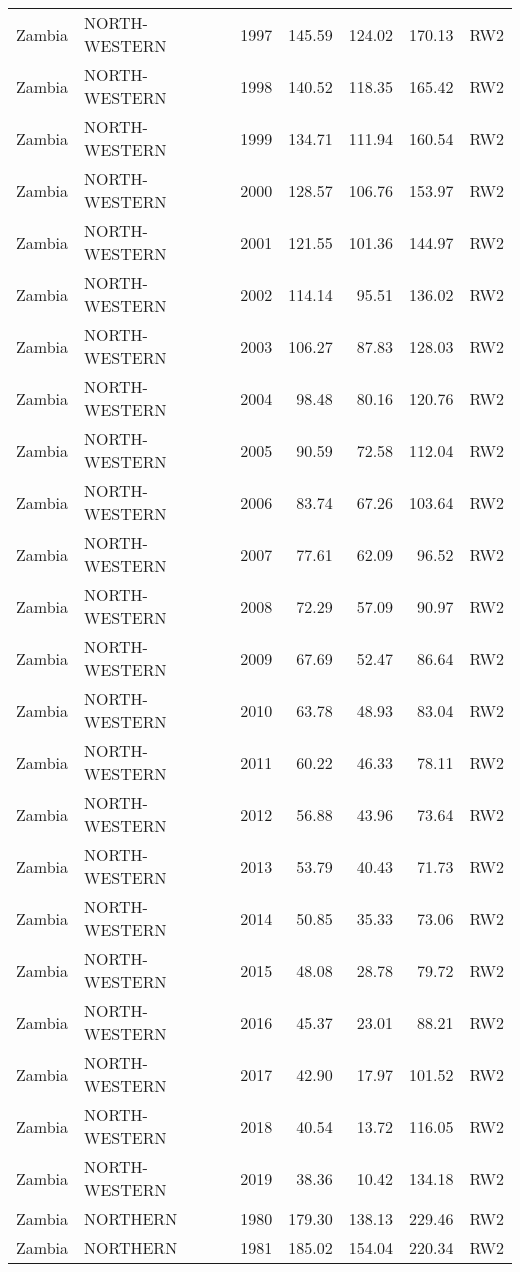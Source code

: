 \begin{longtable}{lllrrrl}
  Zambia & NORTH-WESTERN & 1997 & 145.59 & 124.02 & 170.13 & RW2 \\ 
  Zambia & NORTH-WESTERN & 1998 & 140.52 & 118.35 & 165.42 & RW2 \\ 
  Zambia & NORTH-WESTERN & 1999 & 134.71 & 111.94 & 160.54 & RW2 \\ 
  Zambia & NORTH-WESTERN & 2000 & 128.57 & 106.76 & 153.97 & RW2 \\ 
  Zambia & NORTH-WESTERN & 2001 & 121.55 & 101.36 & 144.97 & RW2 \\ 
  Zambia & NORTH-WESTERN & 2002 & 114.14 & 95.51 & 136.02 & RW2 \\ 
  Zambia & NORTH-WESTERN & 2003 & 106.27 & 87.83 & 128.03 & RW2 \\ 
  Zambia & NORTH-WESTERN & 2004 & 98.48 & 80.16 & 120.76 & RW2 \\ 
  Zambia & NORTH-WESTERN & 2005 & 90.59 & 72.58 & 112.04 & RW2 \\ 
  Zambia & NORTH-WESTERN & 2006 & 83.74 & 67.26 & 103.64 & RW2 \\ 
  Zambia & NORTH-WESTERN & 2007 & 77.61 & 62.09 & 96.52 & RW2 \\ 
  Zambia & NORTH-WESTERN & 2008 & 72.29 & 57.09 & 90.97 & RW2 \\ 
  Zambia & NORTH-WESTERN & 2009 & 67.69 & 52.47 & 86.64 & RW2 \\ 
  Zambia & NORTH-WESTERN & 2010 & 63.78 & 48.93 & 83.04 & RW2 \\ 
  Zambia & NORTH-WESTERN & 2011 & 60.22 & 46.33 & 78.11 & RW2 \\ 
  Zambia & NORTH-WESTERN & 2012 & 56.88 & 43.96 & 73.64 & RW2 \\ 
  Zambia & NORTH-WESTERN & 2013 & 53.79 & 40.43 & 71.73 & RW2 \\ 
  Zambia & NORTH-WESTERN & 2014 & 50.85 & 35.33 & 73.06 & RW2 \\ 
  Zambia & NORTH-WESTERN & 2015 & 48.08 & 28.78 & 79.72 & RW2 \\ 
  Zambia & NORTH-WESTERN & 2016 & 45.37 & 23.01 & 88.21 & RW2 \\ 
  Zambia & NORTH-WESTERN & 2017 & 42.90 & 17.97 & 101.52 & RW2 \\ 
  Zambia & NORTH-WESTERN & 2018 & 40.54 & 13.72 & 116.05 & RW2 \\ 
  Zambia & NORTH-WESTERN & 2019 & 38.36 & 10.42 & 134.18 & RW2 \\ 
  Zambia & NORTHERN & 1980 & 179.30 & 138.13 & 229.46 & RW2 \\ 
  Zambia & NORTHERN & 1981 & 185.02 & 154.04 & 220.34 & RW2 \\ 

\end{longtable}
